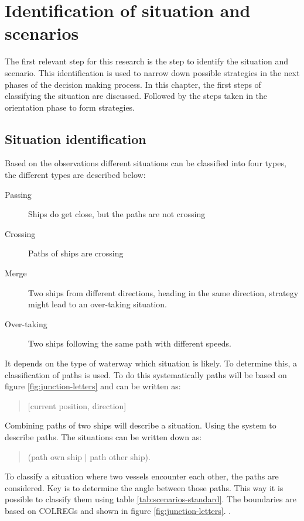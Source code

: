 \chapter{Identification of situation and scenarios}
\label{ch:identify-situation}
The first relevant step for this research is the step to identify the situation and scenario. This identification is used to narrow down possible strategies in the next phases of the decision making process. In this chapter, the first steps of classifying the situation are discussed. Followed by the steps taken in the orientation phase to form strategies.

\section{Situation identification}
\label{sec:situation-identification}
Based on the observations different situations can be classified into four types, the different types are described below: 
\begin{description}
	\item [Passing] Ships do get close, but the paths are not crossing
	\item [Crossing] Paths of ships are crossing
	\item [Merge] Two ships from different directions, heading in the same direction, strategy might lead to an over-taking situation.
	\item [Over-taking] Two ships following the same path with different speeds.
\end{description}
It depends on the type of waterway which situation is likely. To determine this, a classification of paths is used. To do this systematically paths will be based on figure \ref{fig:junction-letters} and can be written as: 
\begin{quote}
	[current position, direction]
\end{quote}
Combining paths of two ships will describe a situation. Using the system to describe paths. The situations can be written down as:
\begin{quote}
	(path own ship $|$ path other ship).
\end{quote}

To classify a situation where two vessels encounter each other, the paths are considered. Key is to determine the angle between those paths. This way it is possible to classify them using table \ref{tab:scenarios-standard}.
The boundaries are based on \ac{COLREGs} and shown in figure \ref{fig:junction-letters}. .

